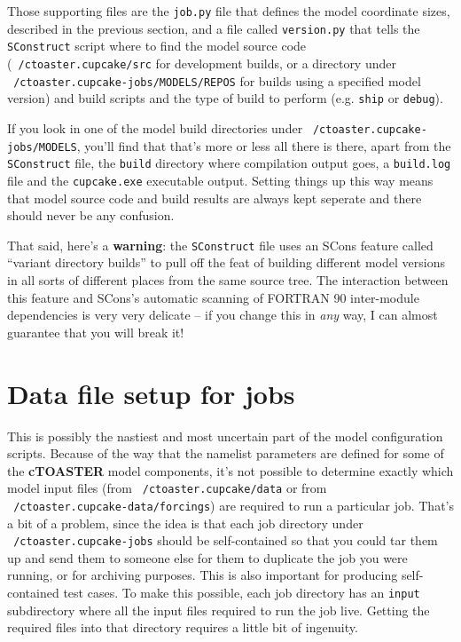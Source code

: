 \documentclass[a4paper,10pt,article]{memoir}
\begin{document}
Those supporting files are the \texttt{job.py} file that defines the
model coordinate sizes, described in the previous section, and a file
called \texttt{version.py} that tells the \texttt{SConstruct} script
where to find the model source code (\texttt{~/ctoaster.cupcake/src} for
development builds, or a directory under
\\\texttt{~/ctoaster.cupcake-jobs/MODELS/REPOS} for builds using a specified model
version) and build scripts and the type of build to perform
(e.g. \texttt{ship} or \texttt{debug}).

If you look in one of the model build directories under
\texttt{~/ctoaster.cupcake-jobs/MODELS}, you'll find that that's more or less
all there is there, apart from the \texttt{SConstruct} file, the
\texttt{build} directory where compilation output goes, a
\texttt{build.log} file and the \texttt{cupcake.exe} executable output.
Setting things up this way means that model source code and build
results are always kept seperate and there should never be any
confusion.

That said, here's a \textbf{warning}: the \texttt{SConstruct} file
uses an SCons feature called ``variant directory builds'' to pull off
the feat of building different model versions in all sorts of
different places from the same source tree.  The interaction between
this feature and SCons's automatic scanning of FORTRAN 90 inter-module
dependencies is very very delicate -- if you change this in \emph{any}
way, I can almost guarantee that you will break it!

\section{Data file setup for jobs}

This is possibly the nastiest and most uncertain part of the model
configuration scripts.  Because of the way that the namelist
parameters are defined for some of the \textbf{cTOASTER} model components, it's
not possible to determine exactly which model input files (from
\texttt{~/ctoaster.cupcake/data} or from 
\\\texttt{~/ctoaster.cupcake-data/forcings}) are
required to run a particular job.  That's a bit of a problem, since
the idea is that each job directory under \texttt{~/ctoaster.cupcake-jobs}
should be self-contained so that you could tar them up and send them
to someone else for them to duplicate the job you were running, or for
archiving purposes.  This is also important for producing
self-contained test cases.  To make this possible, each job directory
has an \texttt{input} subdirectory where all the input files required
to run the job live.  Getting the required files into that directory
requires a little bit of ingenuity.
\end{document}
